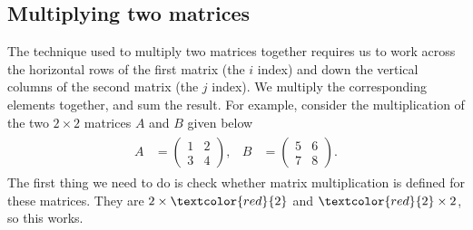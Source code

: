 \documentclass[letterpaper,10pt,english]{jupyterBook}
\begin{document}
\subsection{Multiplying two matrices}
\label{\detokenize{_pages/1.2_Matrix_multiplication:multiplying-two-matrices}}
\sphinxAtStartPar
The technique used to multiply two matrices together requires us to work across the horizontal rows of the first matrix (the \(i\) index) and down the vertical columns of the second matrix (the \(j\) index). We multiply the corresponding elements together, and sum the result. For example, consider the multiplication of the two \(2\times 2\) matrices \(A\) and \(B\) given below
\begin{equation*}
\begin{split} \begin{align*}
    A &= \begin{pmatrix} 1 & 2 \\ 3 & 4 \end{pmatrix}, &
    B &= \begin{pmatrix} 5 & 6 \\ 7 & 8 \end{pmatrix}.
\end{align*} \end{split}
\end{equation*}
\sphinxAtStartPar
The first thing we need to do is check whether matrix multiplication is defined for these matrices. They are \(2 \times \textcolor{red}{2}\) and \(\textcolor{red}{2} \times 2\), so this works.
\end{document}
